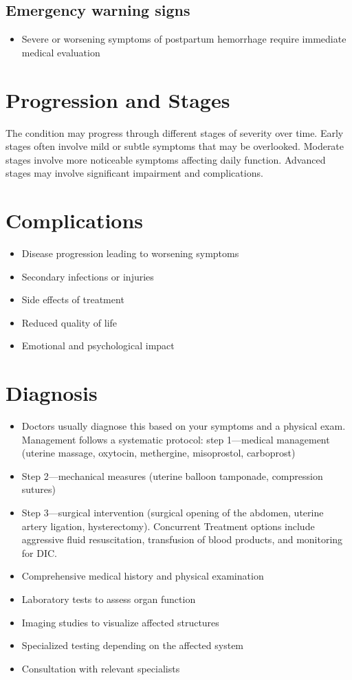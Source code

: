 \subsection{Emergency warning signs}
\begin{itemize}[noitemsep]
  \item Severe or worsening symptoms of postpartum hemorrhage require immediate medical evaluation
\end{itemize}
\section{Progression and Stages}
The condition may progress through different stages of severity over time. Early stages often involve mild or subtle symptoms that may be overlooked. Moderate stages involve more noticeable symptoms affecting daily function. Advanced stages may involve significant impairment and complications.
\section{Complications}
\begin{itemize}[noitemsep]
  \item Disease progression leading to worsening symptoms
  \item Secondary infections or injuries
  \item Side effects of treatment
  \item Reduced quality of life
  \item Emotional and psychological impact
\end{itemize}
\section{Diagnosis}
\begin{itemize}[noitemsep]
  \item Doctors usually diagnose this based on your symptoms and a physical exam. Management follows a systematic protocol: step 1---medical management (uterine massage, oxytocin, methergine, misoprostol, carboprost)
  \item Step 2---mechanical measures (uterine balloon tamponade, compression sutures)
  \item Step 3---surgical intervention (surgical opening of the abdomen, uterine artery ligation, hysterectomy). Concurrent Treatment options include aggressive fluid resuscitation, transfusion of blood products, and monitoring for DIC.
  \item Comprehensive medical history and physical examination
  \item Laboratory tests to assess organ function
  \item Imaging studies to visualize affected structures
  \item Specialized testing depending on the affected system
  \item Consultation with relevant specialists
\end{itemize}
